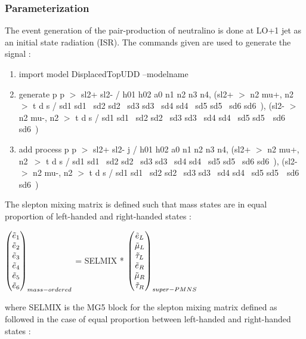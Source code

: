 \documentclass{cernatlasnote}
\begin{document}
\subsubsection{Parameterization}

The event generation of the pair-production of neutralino is done at LO+1 jet as an initial state radiation (ISR).
The commands given are used to generate the signal : \\
\begin{enumerate}
    \item import model DisplacedTopUDD --modelname
    \item generate p p  $>$ sl2+ sl2- / h01 h02 a0 n1 n2 n3 n4, (sl2+ $>$ n2 mu+, n2\
 $>$ t d s / sd1 sd1~ sd2 sd2~ sd3 sd3~ sd4 sd4~ sd5 sd5~ sd6 sd6~), (sl2- $>$ n2 mu-, n2 $>$ t d s / sd1 sd1~ sd2 sd2~ sd3 sd3~ sd4 sd4~ sd5 sd5~\
 sd6 sd6~)  
    \item add process p p  $>$ sl2+ sl2- j / h01 h02 a0 n1 n2 n3 n4, (sl2+ $>$ n2 mu+, n2\
 $>$ t d s / sd1 sd1~ sd2 sd2~ sd3 sd3~ sd4 sd4~ sd5 sd5~ sd6 sd6~), (sl2- $>$ n2 mu-, n2 $>$ t d s / sd1 sd1~ sd2 sd2~ sd3 sd3~ sd4 sd4~ sd5 sd5~\
 sd6 sd6~) 
\end{enumerate}

  The slepton mixing matrix is defined such that mass states are in equal proportion of left-handed and right-handed states :
\begin{center}
 $\begin{pmatrix}
  \Tilde{e}_{1} \\ 
  \Tilde{e}_{2}  \\
  \Tilde{e}_{3} \\
  \Tilde{e}_{4} \\
  \Tilde{e}_{5}  \\
  \Tilde{e}_{6} \\
\end{pmatrix}_{mass-ordered}$ = SELMIX *  $\begin{pmatrix}
  \Tilde{e}_{L} \\ 
  \Tilde{\mu}_{L}  \\
  \Tilde{\tau}_{L} \\
  \Tilde{e}_{R} \\
  \Tilde{\mu}_{R}  \\
  \Tilde{\tau}_{R} \\
\end{pmatrix}_{super-PMNS}$
\end{center}
where SELMIX is the MG5 block for the slepton mixing matrix \cite{Allanach_2009} defined as followed in the case of equal proportion between left-handed and right-handed states :
\end{document}
